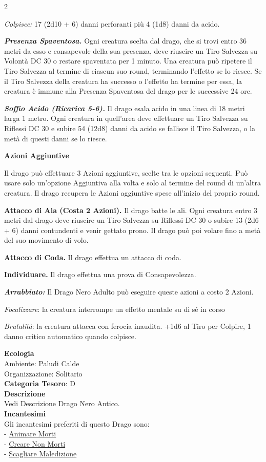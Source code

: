 \begin{multicols}{2}
{\emph{Colpisce:} 17 (2d10 + 6) danni perforanti più 4 (1d8) danni da acido.

\emph{\textbf{Presenza Spaventosa.}} Ogni creatura scelta dal drago, che si trovi entro 36 metri da esso e consapevole della sua presenza, deve riuscire un Tiro Salvezza su Volontà DC 30 o restare spaventata per 1 minuto. Una creatura può ripetere il Tiro Salvezza al termine di ciascun suo round, terminando l'effetto se lo riesce. Se il Tiro Salvezza della creatura ha successo o l'effetto ha termine per essa, la creatura è immune alla Presenza Spaventosa del drago per le successive 24 ore.

\emph{\textbf{Soffio Acido (Ricarica 5-6).}} Il drago esala acido in una linea di 18 metri larga 1 metro. Ogni creatura in quell'area deve effettuare un Tiro Salvezza su Riflessi DC 30 e subire 54 (12d8) danni da acido se fallisce il Tiro Salvezza, o la metà di questi danni se lo riesce.

\textbf{Azioni Aggiuntive}

Il drago può effettuare 3 Azioni aggiuntive, scelte tra le opzioni seguenti. Può usare solo un'opzione Aggiuntiva alla volta e solo al termine del round di un'altra creatura. Il drago recupera le Azioni aggiuntive spese all'inizio del proprio round.

\textbf{Attacco di Ala (Costa 2 Azioni).} Il drago batte le ali. Ogni creatura entro 3 metri dal drago deve riuscire un Tiro Salvezza su Riflessi DC 30 o subire 13 (2d6 + 6) danni contundenti e venir gettato prono. Il drago può poi volare fino a metà del suo movimento di volo.

\textbf{Attacco di Coda.} Il drago effettua un attacco di coda.

\textbf{Individuare.} Il drago effettua una prova di Consapevolezza.

\emph{\textbf{Arrabbiato:}} Il Drago Nero Adulto può eseguire queste azioni a costo 2 Azioni.

\emph{Focalizzare}: la creatura interrompe un effetto mentale su di sé in corso

\emph{Brutalità}: la creatura attacca con ferocia inaudita. +1d6 al Tiro per Colpire, 1 danno critico automatico quando colpisce.

\textbf{Ecologia}\\
Ambiente: Paludi Calde\\
Organizzazione: Solitario\\
\textbf{Categoria Tesoro}: D\\
\textbf{Descrizione}\\
Vedi Descrizione Drago Nero Antico.\\
\textbf{Incantesimi}\\
Gli incantesimi preferiti di questo Drago sono:\\
- \hyperlink{Animare Morti}{Animare Morti}\\
- \hyperlink{Creare Non Morti}{Creare Non Morti}\\
- \hyperlink{Scagliare Maledizione}{Scagliare Maledizione}

}
\end{multicols}
